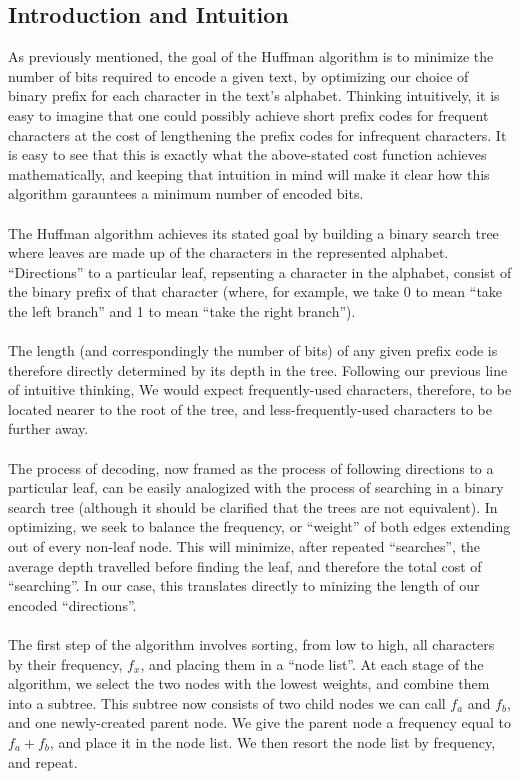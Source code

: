 \documentclass[paper=a4, fontsize=10pt]{article} %
\numberwithin{equation}{section} %
\numberwithin{figure}{section} %
\numberwithin{table}{section} %
\begin{document}
\subsection{Introduction and Intuition}
As previously mentioned, the goal of the Huffman algorithm is to minimize the number of bits required to encode a given text, by optimizing our choice of binary prefix for each character in the text's alphabet. Thinking intuitively, it is easy to imagine that one could possibly achieve short prefix codes for frequent characters at the cost of lengthening the prefix codes for infrequent characters. It is easy to see that this is exactly what the above-stated cost function achieves mathematically, and keeping that intuition in mind will make it clear how this algorithm garauntees a minimum number of encoded bits.
\\
\\
The Huffman algorithm achieves its stated goal by building a binary search tree where leaves are made up of the characters in the represented alphabet. ``Directions'' to a particular leaf, repsenting a character in the alphabet, consist of the binary prefix of that character (where, for example, we take 0 to mean ``take the left branch'' and 1 to mean ``take the right branch'').
\\
\\
The length (and correspondingly the number of bits) of any given prefix code is therefore directly determined by its depth in the tree. Following our previous line of intuitive thinking, We would expect frequently-used characters, therefore, to be located nearer to the root of the tree, and less-frequently-used characters to be further away.
\\
\\
The process of decoding, now framed as the process of following directions to a particular leaf, can be easily analogized with the process of searching in a binary search tree (although it should be clarified that the trees are not equivalent). In optimizing, we seek to balance the frequency, or ``weight'' of both edges extending out of every non-leaf node. This will minimize, after repeated ``searches'', the average depth travelled before finding the leaf, and therefore the total cost of ``searching''. In our case, this translates directly to minizing the length of our encoded ``directions''.
\\
\\
The first step of the algorithm involves sorting, from low to high, all characters by their frequency, $f_x$, and placing them in a ``node list''. At each stage of the algorithm, we select the two nodes with the lowest weights, and combine them into a subtree. This subtree now consists of two child nodes we can call $f_a$  and $f_b$, and one newly-created parent node. We give the parent node a frequency equal to $f_a + f_b$, and place it in the node list. We then resort the node list by frequency, and repeat.
\end{document}
